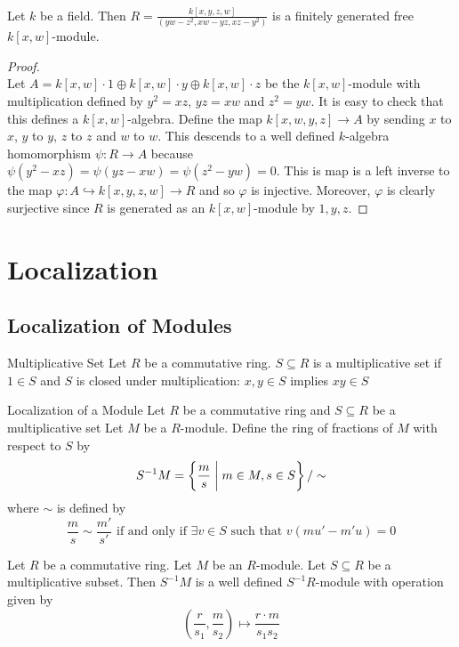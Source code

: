 \documentclass[a4paper]{article}
\begin{document}
\begin{eg}{}{}\\
Let $k$ be a field. Then $R=\frac{k[x,y,z,w]}{(yw-z^2,xw-yz,xz-y^2)}$ is a finitely generated free $k[x,w]$-module. 
\begin{proof}\\
Let $A=k[x,w]\cdot 1\oplus k[x,w]\cdot y\oplus k[x,w]\cdot z$ be the $k[x,w]$-module with multiplication defined by $y^2=xz$, $yz=xw$ and $z^2=yw$. It is easy to check that this defines a $k[x,w]$-algebra. Define the map $k[x,w,y,z]\to A$ by sending $x$ to $x$, $y$ to $y$, $z$ to $z$ and $w$ to $w$. This descends to a well defined $k$-algebra homomorphism $\psi:R\to A$ because $\psi(y^2-xz)=\psi(yz-xw)=\psi(z^2-yw)=0$. This is map is a left inverse to the map $\varphi:A\hookrightarrow k[x,y,z,w]\to R$ and so $\varphi$ is injective. Moreover, $\varphi$ is clearly surjective since $R$ is generated as an $k[x,w]$-module by $1,y,z$. 
\end{proof}
\end{eg}

\pagebreak
\section{Localization}
\subsection{Localization of Modules}
\begin{defn}{Multiplicative Set}{} Let $R$ be a commutative ring. $S\subseteq R$ is a multiplicative set if $1\in S$ and $S$ is closed under multiplication: $x,y\in S$ implies $xy\in S$
\end{defn}

\begin{defn}{Localization of a Module}{} Let $R$ be a commutative ring and $S\subseteq R$ be a multiplicative set Let $M$ be a $R$-module. Define the ring of fractions of $M$ with respect to $S$ by $$S^{-1}M=\left\{\frac{m}{s}\;\bigg{|}\;m\in M,s\in S\right\}/\sim$$ where $\sim$ is defined by $$\frac{m}{s}\sim\frac{m'}{s'}\text{ if and only if }\exists v\in S\text{ such that }v(mu'-m'u)=0$$
\end{defn}

\begin{lmm}{}{} Let $R$ be a commutative ring. Let $M$ be an $R$-module. Let $S\subseteq R$ be a multiplicative subset. Then $S^{-1}M$ is a well defined $S^{-1}R$-module with operation given by $$\left(\frac{r}{s_1},\frac{m}{s_2}\right)\mapsto\frac{r\cdot m}{s_1s_2}$$
\end{lmm}
\end{document}
